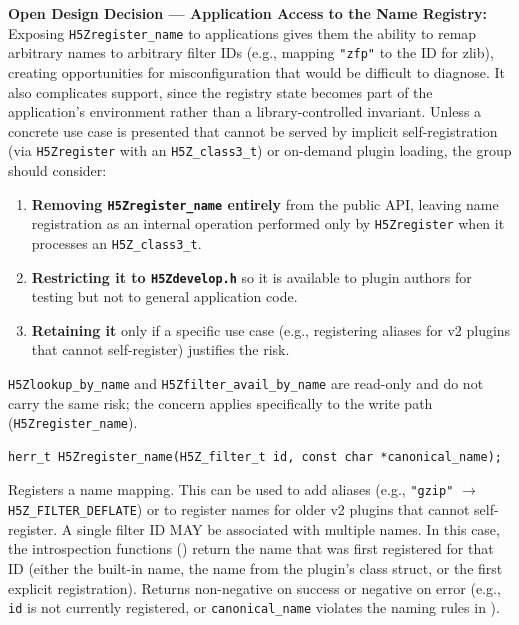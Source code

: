 \documentclass[../HDF5_RFC.tex]{subfiles}
\begin{document}
\noindent\colorbox{yellow!25}{\parbox{\dimexpr\linewidth-2\fboxsep}{%
  \textbf{Open Design Decision --- Application Access to the Name Registry:}
  Exposing \texttt{H5Zregister\_name} to applications gives them the ability to
  remap arbitrary names to arbitrary filter IDs (e.g., mapping \texttt{"zfp"} to
  the ID for zlib), creating opportunities for misconfiguration that would be
  difficult to diagnose.  It also complicates support, since the registry
  state becomes part of the application's environment rather than a
  library-controlled invariant.  Unless a concrete use case is presented that
  cannot be served by implicit self-registration (via \texttt{H5Zregister} with an
  \texttt{H5Z\_class3\_t}) or on-demand plugin loading, the group should consider:
  \begin{enumerate}
    \item \textbf{Removing \texttt{H5Zregister\_name} entirely} from the public API,
          leaving name registration as an internal operation performed only
          by \texttt{H5Zregister} when it processes an \texttt{H5Z\_class3\_t}.
    \item \textbf{Restricting it to \texttt{H5Zdevelop.h}} so it is available to
          plugin authors for testing but not to general application code.
    \item \textbf{Retaining it} only if a specific use case (e.g., registering
          aliases for v2 plugins that cannot self-register) justifies the risk.
  \end{enumerate}
  \texttt{H5Zlookup\_by\_name} and \texttt{H5Zfilter\_avail\_by\_name} are read-only and
  do not carry the same risk; the concern applies specifically to the
  write path (\texttt{H5Zregister\_name}).
}}

\begin{verbatim}
herr_t H5Zregister_name(H5Z_filter_t id, const char *canonical_name);
\end{verbatim}

Registers a name mapping. This can be used to add aliases (e.g.,
\texttt{"gzip"} $\rightarrow$ \texttt{H5Z\_FILTER\_DEFLATE}) or to register names for older v2 plugins
that cannot self-register. A single filter ID MAY be associated with multiple
names. In this case, the introspection functions () return the name
that was first registered for that ID (either the built-in name, the name from
the plugin's class struct, or the first explicit registration).
Returns non-negative on success or negative on error (e.g., \texttt{id} is
not currently registered, or \texttt{canonical\_name} violates the naming rules
in ).
\end{document}
